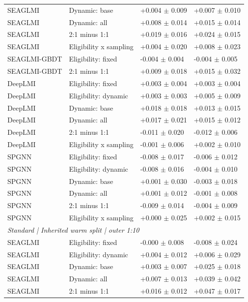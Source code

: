 {\begin{longtable}{llll}
SEAGLMI & Dynamic: base & +0.004 $\pm$ 0.009 & +0.007 $\pm$ 0.010 \\
SEAGLMI & Dynamic: all & +0.008 $\pm$ 0.014 & +0.015 $\pm$ 0.014 \\
SEAGLMI & 2:1 minus 1:1 & +0.019 $\pm$ 0.016 & +0.024 $\pm$ 0.015 \\
SEAGLMI & Eligibility x sampling & +0.004 $\pm$ 0.020 & +0.008 $\pm$ 0.023 \\
SEAGLMI-GBDT & Eligibility: fixed & -0.004 $\pm$ 0.004 & -0.004 $\pm$ 0.005 \\
SEAGLMI-GBDT & 2:1 minus 1:1 & +0.009 $\pm$ 0.018 & +0.015 $\pm$ 0.032 \\
DeepLMI & Eligibility: fixed & +0.003 $\pm$ 0.004 & +0.003 $\pm$ 0.004 \\
DeepLMI & Eligibility: dynamic & +0.003 $\pm$ 0.003 & +0.005 $\pm$ 0.009 \\
DeepLMI & Dynamic: base & +0.018 $\pm$ 0.018 & +0.013 $\pm$ 0.015 \\
DeepLMI & Dynamic: all & +0.017 $\pm$ 0.021 & +0.015 $\pm$ 0.012 \\
DeepLMI & 2:1 minus 1:1 & -0.011 $\pm$ 0.020 & -0.012 $\pm$ 0.006 \\
DeepLMI & Eligibility x sampling & -0.001 $\pm$ 0.006 & +0.002 $\pm$ 0.010 \\
SPGNN & Eligibility: fixed & -0.008 $\pm$ 0.017 & -0.006 $\pm$ 0.012 \\
SPGNN & Eligibility: dynamic & -0.008 $\pm$ 0.016 & -0.004 $\pm$ 0.010 \\
SPGNN & Dynamic: base & +0.001 $\pm$ 0.030 & -0.003 $\pm$ 0.018 \\
SPGNN & Dynamic: all & +0.001 $\pm$ 0.012 & -0.001 $\pm$ 0.008 \\
SPGNN & 2:1 minus 1:1 & -0.009 $\pm$ 0.014 & -0.004 $\pm$ 0.009 \\
SPGNN & Eligibility x sampling & +0.000 $\pm$ 0.025 & +0.002 $\pm$ 0.015 \\
\multicolumn{4}{l}{\textit{Standard | Inherited warm split | outer 1:10}}\\
SEAGLMI & Eligibility: fixed & -0.000 $\pm$ 0.008 & -0.008 $\pm$ 0.024 \\
SEAGLMI & Eligibility: dynamic & +0.004 $\pm$ 0.012 & +0.006 $\pm$ 0.029 \\
SEAGLMI & Dynamic: base & +0.003 $\pm$ 0.007 & +0.025 $\pm$ 0.018 \\
SEAGLMI & Dynamic: all & +0.007 $\pm$ 0.013 & +0.039 $\pm$ 0.042 \\
SEAGLMI & 2:1 minus 1:1 & +0.016 $\pm$ 0.012 & +0.047 $\pm$ 0.017 \\

\end{longtable}}
